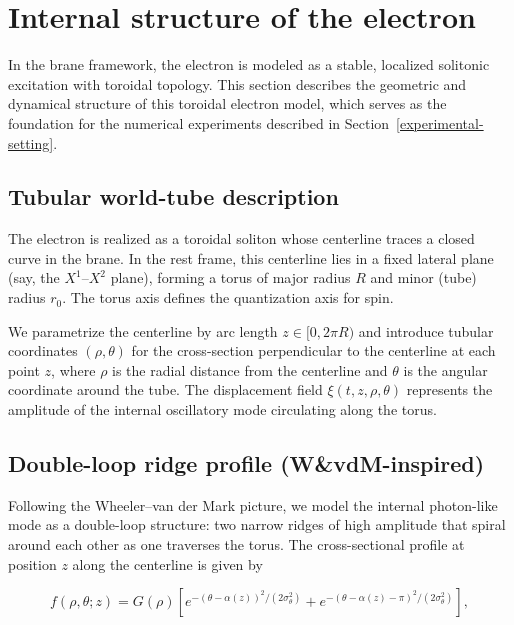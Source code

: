 \section{Internal structure of the electron}
\label{sec:internal-structure-of-the-electron}

In the brane framework, the electron is modeled as a stable, localized solitonic
excitation with toroidal topology. This section describes the geometric and
dynamical structure of this toroidal electron model, which serves as the
foundation for the numerical experiments described in
Section~\ref{experimental-setting}.

\subsection{Tubular world-tube description}
\label{subsec:tubular-electron}

The electron is realized as a toroidal soliton whose centerline traces a closed
curve in the brane. In the rest frame, this centerline lies in a fixed lateral
plane (say, the $X^1$--$X^2$ plane), forming a torus of major radius $R$ and
minor (tube) radius $r_0$. The torus axis defines the quantization axis for
spin.

We parametrize the centerline by arc length $z \in [0, 2\pi R)$ and introduce
tubular coordinates $(\rho, \theta)$ for the cross-section perpendicular to the
centerline at each point $z$, where $\rho$ is the radial distance from the
centerline and $\theta$ is the angular coordinate around the tube. The
displacement field $\xi(t,z,\rho,\theta)$ represents the amplitude of the
internal oscillatory mode circulating along the torus.

\subsection{Double-loop ridge profile (W\&vdM-inspired)}

Following the Wheeler--van der Mark picture, we model the internal photon-like
mode as a double-loop structure: two narrow ridges of high amplitude that spiral
around each other as one traverses the torus. The cross-sectional profile at
position $z$ along the centerline is given by

\begin{equation}
f(\rho,\theta;z) = G(\rho) \left[
e^{-(\theta-\alpha(z))^2/(2\sigma_\theta^2)}
+ e^{-(\theta-\alpha(z)-\pi)^2/(2\sigma_\theta^2)}
\right],
\label{eq:double-tunnel-profile}
\end{equation}

